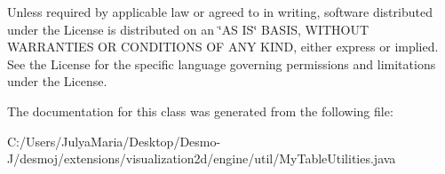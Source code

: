 Unless required by applicable law or agreed to in writing, software distributed under the License is distributed on an \char`\"{}\-A\-S I\-S\char`\"{} B\-A\-S\-I\-S, W\-I\-T\-H\-O\-U\-T W\-A\-R\-R\-A\-N\-T\-I\-E\-S O\-R C\-O\-N\-D\-I\-T\-I\-O\-N\-S O\-F A\-N\-Y K\-I\-N\-D, either express or implied. See the License for the specific language governing permissions and limitations under the License. 

The documentation for this class was generated from the following file\-:\begin{DoxyCompactItemize}
\item 
C\-:/\-Users/\-Julya\-Maria/\-Desktop/\-Desmo-\/\-J/desmoj/extensions/visualization2d/engine/util/My\-Table\-Utilities.\-java\end{DoxyCompactItemize}
